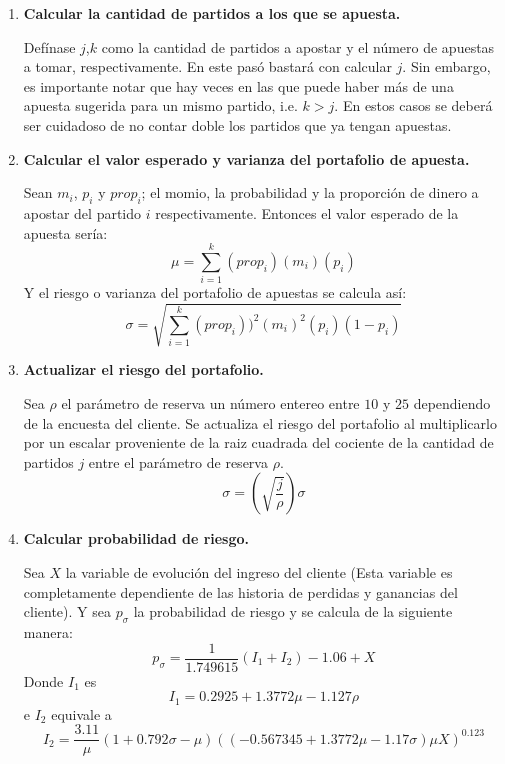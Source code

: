 \begin{enumerate}
	\item \textbf{Calcular la cantidad de partidos a los que se apuesta.}
	
	
Defínase $j$,$k$ como la cantidad de partidos a apostar y el número de apuestas a tomar, respectivamente.
En este pasó bastará con calcular $j$. Sin embargo, es importante notar que hay veces en las que puede haber más de una apuesta sugerida para un mismo partido, i.e. $k>j$. En estos casos se deberá ser cuidadoso de no contar doble los partidos que ya tengan apuestas.

	\item \textbf{Calcular el valor esperado y varianza del portafolio de apuesta.}
	
	
	Sean $m_i$, $p_i$ y $prop_i$; el momio, la probabilidad y la proporción de dinero a apostar del partido $i$ respectivamente. Entonces el valor esperado de la apuesta sería:
	\[\mu = \sum_{i=1}^{k}{(prop_i)(m_i)(p_i)}\]
	Y el riesgo o varianza del portafolio de apuestas se calcula así:
	\[\sigma = \sqrt{\sum_{i=1}^{k}{(prop_i))^2(m_i)^2(p_i)(1-p_i)}}\]
	
	
	\item \textbf{Actualizar el riesgo del portafolio.}
	
	
	Sea $\rho$ el parámetro de reserva un número entereo entre $10$ y $25$ dependiendo de la encuesta del cliente. Se actualiza el riesgo del portafolio al multiplicarlo por un escalar proveniente de la raiz cuadrada del cociente de la cantidad de partidos $j$ entre el parámetro de reserva $\rho$.
	\[\sigma = \left(\sqrt{\frac{j}{\rho}}\right)\sigma\]
	

	\item \textbf{Calcular probabilidad de riesgo.}
	
	Sea $X$ la variable de evolución del ingreso del cliente (Esta variable es completamente dependiente de las historia de perdidas y ganancias del cliente). Y sea $p_\sigma$ la probabilidad de riesgo y se calcula de la siguiente manera:
	\[p_\sigma = \frac{1}{1.749615}(I_1 + I_2) - 1.06 + X\]
	Donde $I_1$ es
	\[I_1 = 0.2925 +1.3772\mu - 1.127\rho\]
	e $I_2$ equivale a
	\[I_2 = \frac{3.11}{\mu}(1 + 0.792\sigma - \mu)((-0.567345 + 1.3772\mu -1.17\sigma)\mu X)^{0.123}\]
	

\end{enumerate}

